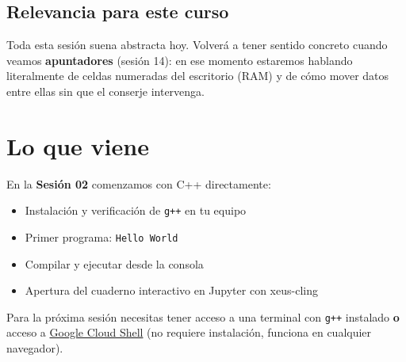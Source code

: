 \documentclass[12pt, oneside]{article}
\begin{document}
\subsection{Relevancia para este curso}

Toda esta sesión suena abstracta hoy. Volverá a tener sentido concreto cuando
veamos \textbf{apuntadores} (sesión 14): en ese momento estaremos hablando
literalmente de celdas numeradas del escritorio (RAM) y de cómo mover datos
entre ellas sin que el conserje intervenga.

\section{Lo que viene}

En la \textbf{Sesión 02} comenzamos con C++ directamente:

\begin{itemize}
  \item Instalación y verificación de \texttt{g++} en tu equipo
  \item Primer programa: \texttt{Hello World}
  \item Compilar y ejecutar desde la consola
  \item Apertura del cuaderno interactivo en Jupyter con xeus-cling
\end{itemize}

\begin{recuerda}
  Para la próxima sesión necesitas tener acceso a una terminal con
  \texttt{g++} instalado \textbf{o} acceso a
  \href{https://shell.cloud.google.com}{Google Cloud Shell}
  (no requiere instalación, funciona en cualquier navegador).
\end{recuerda}
\end{document}
